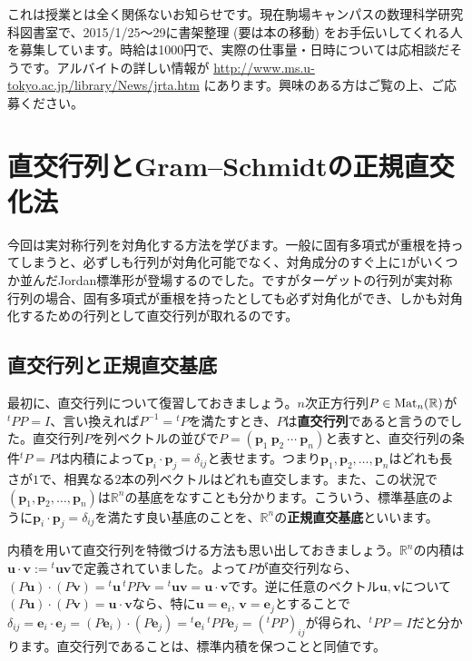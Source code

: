 これは授業とは全く関係ないお知らせです。現在駒場キャンパスの数理科学研究科図書室で、2015/1/25～29に書架整理 (要は本の移動) をお手伝いしてくれる人を募集しています。時給は1000円で、実際の仕事量・日時については応相談だそうです。アルバイトの詳しい情報が \url{http://www.ms.u-tokyo.ac.jp/library/News/jrta.htm} にあります。興味のある方はご覧の上、ご応募ください。

\section{直交行列とGram--Schmidtの正規直交化法}

今回は実対称行列を対角化する方法を学びます。一般に固有多項式が重根を持ってしまうと、必ずしも行列が対角化可能でなく、対角成分のすぐ上に$1$がいくつか並んだJordan標準形が登場するのでした。ですがターゲットの行列が実対称行列の場合、固有多項式が重根を持ったとしても必ず対角化ができ、しかも対角化するための行列として直交行列が取れるのです。

\subsection{直交行列と正規直交基底}

最初に、直交行列について復習しておきましょう。$n$次正方行列$P \in \operatorname{Mat}_n(\mathbb{R})$が${}^t P P = I$、言い換えれば$P^{-1} = {}^tP$を満たすとき、$P$は\textbf{直交行列}であると言うのでした。直交行列$P$を列ベクトルの並びで$P = (\bm{p}_1 \ \bm{p}_2 \ \cdots \ \bm{p}_n)$と表すと、直交行列の条件${}^tP = P$は内積によって$\bm{p}_i \cdot \bm{p}_j = \delta_{ij}$と表せます。つまり$\bm{p}_1, \bm{p}_2, \ldots, \bm{p}_n$はどれも長さが$1$で、相異なる$2$本の列ベクトルはどれも直交します。また、この状況で$(\bm{p}_1, \bm{p}_2, \ldots, \bm{p}_n)$は$\mathbb{R}^n$の基底をなすことも分かります。こういう、標準基底のように$\bm{p}_i \cdot \bm{p}_j = \delta_{ij}$を満たす良い基底のことを、$\mathbb{R}^n$の\textbf{正規直交基底}といいます。

内積を用いて直交行列を特徴づける方法も思い出しておきましょう。$\mathbb{R}^n$の内積は$\bm{u} \cdot \bm{v} := {}^t\bm{u} \bm{v}$で定義されていました。よって$P$が直交行列なら、$(P\bm{u}) \cdot (P\bm{v}) = {}^t\bm{u}\, {}^tP P \bm{v} = {}^t\bm{u} \bm{v} = \bm{u} \cdot \bm{v}$です。逆に任意のベクトル$\bm{u}, \bm{v}$について$(P\bm{u}) \cdot (P\bm{v}) = \bm{u} \cdot \bm{v}$なら、特に$\bm{u} = \bm{e}_i$, $\bm{v} = \bm{e}_j$とすることで$\delta_{ij} = \bm{e}_i \cdot \bm{e}_j = (P\bm{e}_i) \cdot (P\bm{e}_j) = {}^t\bm{e}_i\, {}^tP P \bm{e}_j = ({}^tP P)_{ij}$が得られ、${}^tP P = I$だと分かります。直交行列であることは、標準内積を保つことと同値です。

